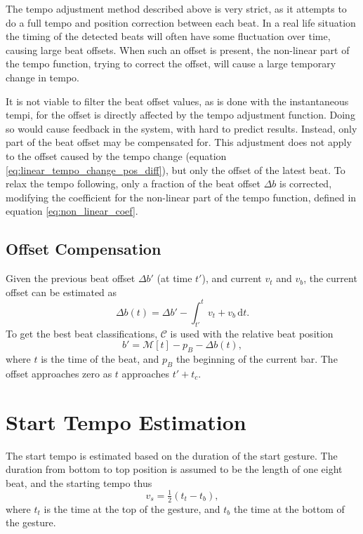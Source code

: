 The tempo adjustment method described above is very strict,
as it attempts to do a full tempo and position correction
between each beat.
In a real life situation
the timing of the detected beats will often have some
fluctuation over time,
causing large beat offsets.
When such an offset is present,
the non-linear part of the tempo function,
trying to correct the offset,
will cause a large temporary change in tempo.

It is not viable to filter the beat offset values,
as is done with the instantaneous tempi,
for the offset is directly affected by
the tempo adjustment function.
Doing so would cause feedback in the system,
with hard to predict results.
Instead, only part of the beat offset may be compensated for.
This adjustment does not apply to
the offset caused by the tempo change
(equation \ref{eq:linear_tempo_change_pos_diff}),
but only the offset of the latest beat.
To relax the tempo following,
only a fraction of the beat offset $\Delta b$ is corrected,
modifying the coefficient for the non-linear 
part of the tempo function, defined in equation
\ref{eq:non_linear_coef}.


\subsection{Offset Compensation}

Given the previous beat offset $\Delta b'$ (at time $t'$),
and current $v_t$ and $v_b$,
the current offset can be estimated as
\begin{equation}
\Delta b(t) = \Delta b' - \int_{t'}^t v_t + v_b \, \mathrm{d}t.
\end{equation}
To get the best beat classifications,
$ \mathcal{C} $ is used with the relative beat position
\begin{equation}
b' = \mathcal{M} [ t ] - p_B - \Delta b(t),
\end{equation}
where $t$ is the time of the beat,
and $p_B$ the beginning of the current bar.
The offset approaches zero as $t$ approaches $t' + t_c$.

\section{Start Tempo Estimation}
\label{sec:meth:start_tempo_estimation}

The start tempo is estimated based on
the duration of the start gesture.
The duration from bottom to top position is
assumed to be the length of one eight beat,
and the starting tempo thus
\begin{equation}
v_s = \tfrac{1}{2} (t_t - t_b),
\end{equation}
where $t_t$ is the time at the top of the gesture,
and $t_b$ the time at the bottom of the gesture.

